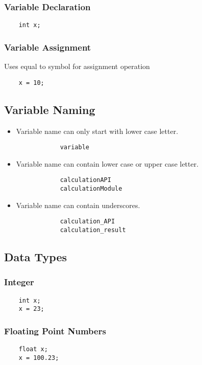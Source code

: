 \documentclass[12pt,letterpaper]{article}
\begin{document}
\subsubsection{Variable Declaration}
\begin{verbatim}
    int x;
\end{verbatim}

\subsubsection{Variable Assignment}
Uses equal to symbol for assignment operation
\begin{verbatim}
    x = 10;
\end{verbatim}

\subsection{Variable Naming}
\begin{itemize}
    \item Variable name can only start with lower case letter.
        \begin{verbatim}
            variable
        \end{verbatim}
    \item Variable name can contain lower case or upper case letter.
        \begin{verbatim}
            calculationAPI
            calculationModule
        \end{verbatim}
    \item Variable name can contain underscores.
        \begin{verbatim}
            calculation_API
            calculation_result
        \end{verbatim}
\end{itemize}

\subsection{Data Types}
\subsubsection{Integer}
\begin{verbatim}
    int x;
    x = 23;
\end{verbatim}

\subsubsection{Floating Point Numbers}
\begin{verbatim}
    float x;
    x = 100.23;
\end{verbatim}
\end{document}
